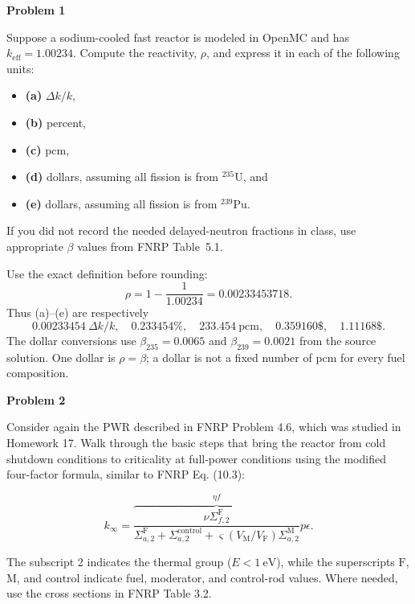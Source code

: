 \noindent\textbf{Problem 1}

Suppose a sodium-cooled fast reactor is modeled in OpenMC and has \(k_{\mathrm{eff}}=1.00234\). Compute the reactivity, \(\rho\), and express it in each of the following units:

\begin{itemize}
\tightlist
\item
  \textbf{(a)} \(\Delta k/k\),
\item
  \textbf{(b)} percent,
\item
  \textbf{(c)} pcm,
\item
  \textbf{(d)} dollars, assuming all fission is from \({}^{235}\mathrm{U}\), and
\item
  \textbf{(e)} dollars, assuming all fission is from \({}^{239}\mathrm{Pu}\).
\end{itemize}

If you did not record the needed delayed-neutron fractions in class, use appropriate \(\beta\) values from FNRP Table~5.1.

\begin{adaptedsolution}

Use the exact definition before rounding:
\[
\rho=1-\frac1{1.00234}=0.00233453718.
\]
Thus (a)--(e) are respectively
\[
\boxed{0.00233454~\Delta k/k},\quad
\boxed{0.233454\%},\quad\boxed{233.454~\mathrm{pcm}},\quad
\boxed{0.359160\$},\quad\boxed{1.11168\$}.
\]
The dollar conversions use $\beta_{235}=0.0065$ and
$\beta_{239}=0.0021$ from the source solution. One dollar is $\rho=\beta$;
a dollar is not a fixed number of pcm for every fuel composition.

\end{adaptedsolution}

\newpage
\noindent\textbf{Problem 2}

Consider again the PWR described in FNRP Problem 4.6, which was studied in Homework 17. Walk through the basic steps that bring the reactor from cold shutdown conditions to criticality at full-power conditions using the modified four-factor formula, similar to FNRP Eq. (10.3):

\[
k_{\infty}
=\overbrace{
  \frac{\nu\Sigma^{\mathrm{F}}_{f,2}}
  {\Sigma^{\mathrm{F}}_{a,2}
   +\Sigma^{\mathrm{control}}_{a,2}
   +\varsigma(V_{\mathrm{M}}/V_{\mathrm{F}})\Sigma^{\mathrm{M}}_{a,2}}
}^{\eta f}p\epsilon.
\]

The subscript 2 indicates the thermal group (\(E<1~\mathrm{eV}\)), while the superscripts \(\mathrm{F}\), \(\mathrm{M}\), and \(\mathrm{control}\) indicate fuel, moderator, and control-rod values. Where needed, use the cross sections in FNRP Table 3.2.

